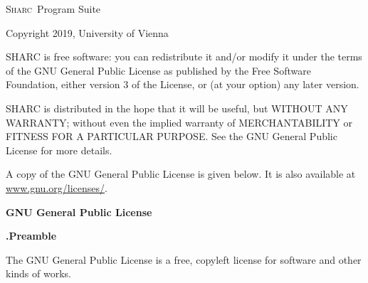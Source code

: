 \documentclass[a4paper,10pt,DIV=15,openany]{scrbook}
\newcommand{\link}[2]{\href{#1}{#2}}
\newcommand{\sharc}{\textsc{Sharc}}
\begin{document}
\newcommand{\licensepara}[1]{\vspace{\bigskipamount}\addtocounter{licenseparacount}{1}\textbf{\thelicenseparacount.\quad#1}\newline}
{
\begin{shaded}

\sharc\ Program Suite

Copyright \textcopyright{}2019, University of Vienna

SHARC is free software: you can redistribute it and/or modify
it under the terms of the GNU General Public License as published by
the Free Software Foundation, either version 3 of the License, or
(at your option) any later version.

SHARC is distributed in the hope that it will be useful,
but WITHOUT ANY WARRANTY; without even the implied warranty of
MERCHANTABILITY or FITNESS FOR A PARTICULAR PURPOSE.  See the
GNU General Public License for more details.

A copy of the GNU General Public License is given below.
It is also available at \link{http://www.gnu.org/licenses/}{www.gnu.org/licenses/}.



% 
% 

% 
% 
% 
% 

\begin{center}
  {\bfseries\large GNU General Public License}
\end{center}
\vspace{-3mm}

\licensepara{Preamble}

The GNU General Public License is a free, copyleft license for
software and other kinds of works.


\end{shaded}}
\end{document}
